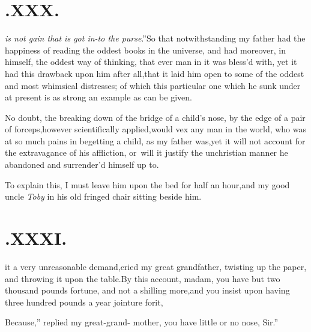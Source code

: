 \documentclass{article}
\begin{document}
\section{.\quad  XXX.}

\textit{is not
gain that is got in-\break to the purse}.”\tsk So that\break
notwithstanding my father had the happiness of reading the
oddest books in the universe, and had moreover, in himself, the
oddest way of thinking, that ever man in it was bless’d with, yet
it had this drawback upon him after all,\tsh that it laid him
open to some of the oddest and most whimsical distresses; of
which this particular one which he sunk under at present is as
strong an example as can be given.

No doubt, the breaking down of the bridge of a child’s
nose, by the edge of a pair of forceps,\tsk however scientifically
applied,\tsk would vex any man in the world, who was at so much
pains in begetting a child, as my father was,\tsk yet it will not
account for the extravagance of his affliction, or\sic\ will it justify
the unchristian manner he abandoned and surrender’d himself up
to.

To explain this, I must leave him upon the bed for half an
hour,\tsh and my good uncle \textit{Toby} in his old fringed
chair sitting beside him.

\section{.\quad  XXXI.}

 it a very unreason\-able
demand,\tsk cried my great\break
grandfather, twisting up the paper,
and throwing it upon the table.\tsh By this account, madam, you
have but two thou\-sand pounds fortune, and not a shilling
more,\tsh and you insist upon having three hundred pounds a year
jointure for\break it,\tsk

\tsk \lqq Because,” replied my great-grand-\break
mother, \lqq you have little or no nose,\break
\lqq Sir.”\tsh
\end{document}
